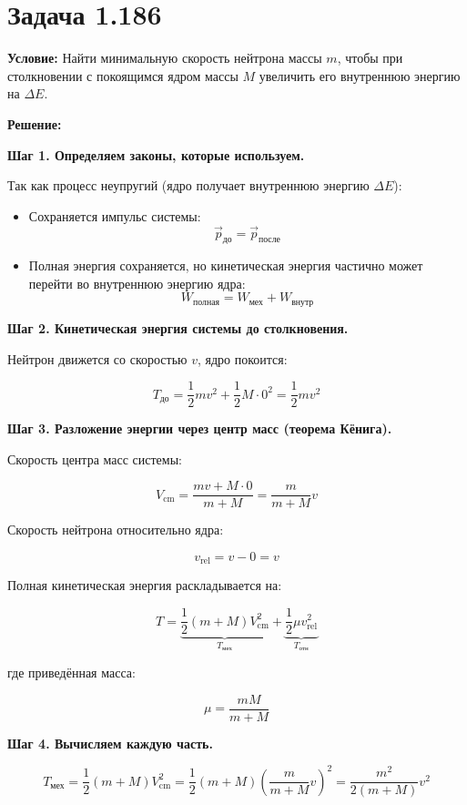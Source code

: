 \documentclass[a4paper,12pt]{article}
\begin{document}
\section*{Задача 1.186}

\textbf{Условие:} Найти минимальную скорость нейтрона массы $m$, чтобы при столкновении с покоящимся ядром массы $M$ увеличить его внутреннюю энергию на $\Delta E$.

\bigskip

\textbf{Решение:}

\medskip
\textbf{Шаг 1. Определяем законы, которые используем.}

Так как процесс неупругий (ядро получает внутреннюю энергию $\Delta E$):

\begin{itemize}
    \item Сохраняется импульс системы: 
    \[
        \vec p_\text{до} = \vec p_\text{после}
    \]
    \item Полная энергия сохраняется, но кинетическая энергия частично может перейти во внутреннюю энергию ядра:
    \[
        W_\text{полная} = W_\text{мех} + W_\text{внутр}
    \]
\end{itemize}

\medskip
\textbf{Шаг 2. Кинетическая энергия системы до столкновения.}

Нейтрон движется со скоростью $v$, ядро покоится:

\[
T_\text{до} = \frac{1}{2} m v^2 + \frac{1}{2} M \cdot 0^2 = \frac{1}{2} m v^2
\]

\medskip
\textbf{Шаг 3. Разложение энергии через центр масс (теорема Кёнига).}

Скорость центра масс системы:

\[
V_\text{cm} = \frac{m v + M \cdot 0}{m + M} = \frac{m}{m + M} v
\]

Скорость нейтрона относительно ядра:

\[
v_\text{rel} = v - 0 = v
\]

Полная кинетическая энергия раскладывается на:

\[
T = \underbrace{\frac{1}{2}(m+M)V_\text{cm}^2}_{T_\text{мех}} + \underbrace{\frac{1}{2} \mu v_\text{rel}^2}_{T_\text{отн}}
\]

где приведённая масса:

\[
\mu = \frac{m M}{m + M}
\]

\medskip
\textbf{Шаг 4. Вычисляем каждую часть.}

\[
T_\text{мех} = \frac{1}{2} (m+M) V_\text{cm}^2 = \frac{1}{2} (m+M) \left(\frac{m}{m+M} v\right)^2 = \frac{m^2}{2 (m+M)} v^2
\]
\end{document}
